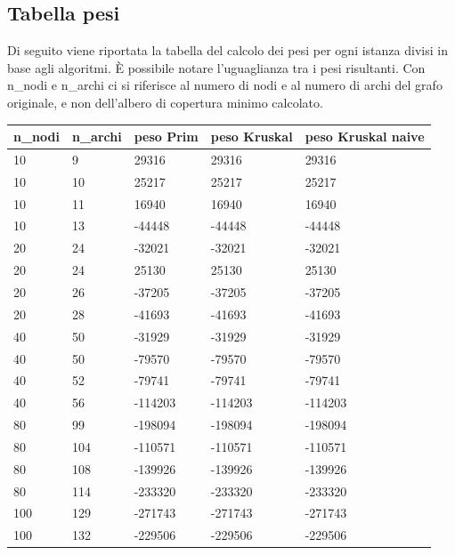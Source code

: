 \newpage

\subsection{Tabella pesi}
\label{tabella\_pesi}

Di seguito viene riportata la tabella del calcolo dei pesi per ogni istanza divisi in base agli algoritmi. È possibile notare l'uguaglianza tra i pesi risultanti.
Con n\_nodi e n\_archi ci si riferisce al numero di nodi e al numero di archi del grafo originale, e non dell'albero di copertura minimo calcolato. 

\renewcommand{\arraystretch}{2}
\begin{longtable}[H]{|p{1.5cm}|p{1.5cm}|p{1.5cm}|p{3cm}|p{3.5cm}|} \hline
    \rowcolor{lightgray}
    \textbf{n\_nodi} & \textbf{n\_archi} & \textbf{peso Prim} & \textbf{peso Kruskal} & \textbf{peso Kruskal naive} \\ \hline\hline
    \endhead
    10 & 9 & 29316 & 29316 & 29316 \\ \hline
    10 & 10 & 25217 & 25217 & 25217 \\ \hline
    10 & 11 & 16940 & 16940 & 16940 \\ \hline
    10 & 13 & -44448 & -44448 & -44448 \\ \hline
    20 & 24 & -32021 & -32021 & -32021 \\ \hline 
    20 & 24 & 25130 & 25130 & 25130 \\ \hline
    20 & 26 & -37205 & -37205 & -37205 \\ \hline
    20 & 28 & -41693 & -41693 & -41693 \\ \hline
    40 & 50 & -31929 & -31929 & -31929 \\ \hline
    40 & 50 & -79570 & -79570 & -79570 \\ \hline
    40 & 52 & -79741 & -79741 & -79741 \\ \hline
    40 & 56 & -114203 & -114203 & -114203 \\ \hline
    80 & 99 & -198094 & -198094 & -198094 \\ \hline
    80 & 104 & -110571 & -110571 & -110571 \\ \hline
    80 & 108 & -139926 & -139926 & -139926 \\ \hline
    80 & 114 & -233320 & -233320 & -233320 \\ \hline
    100 & 129 & -271743 & -271743 & -271743 \\ \hline
    100 & 132 & -229506 & -229506 & -229506 \\ \hline

\end{longtable}
